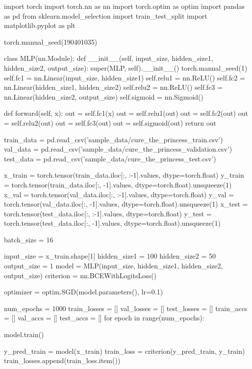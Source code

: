 \documentclass[11pt]{article}
\begin{document}
\begin{python}
import torch
import torch.nn as nn
import torch.optim as optim
import pandas as pd
from sklearn.model_selection import train_test_split
import matplotlib.pyplot as plt

torch.manual_seed(190401035)

class MLP(nn.Module):
    def __init__(self, input_size, hidden_size1, hidden_size2, output_size):
        super(MLP, self).__init__()
        torch.manual_seed(1)
        self.fc1 = nn.Linear(input_size, hidden_size1)
        self.relu1 = nn.ReLU()
        self.fc2 = nn.Linear(hidden_size1, hidden_size2)
        self.relu2 = nn.ReLU()
        self.fc3 = nn.Linear(hidden_size2, output_size)
        self.sigmoid = nn.Sigmoid()

    def forward(self, x):
        out = self.fc1(x)
        out = self.relu1(out)
        out = self.fc2(out)
        out = self.relu2(out)
        out = self.fc3(out)
        out = self.sigmoid(out)
        return out


train_data = pd.read_csv('sample_data/cure_the_princess_train.csv')
val_data = pd.read_csv('sample_data/cure_the_princess_validation.csv')
test_data = pd.read_csv('sample_data/cure_the_princess_test.csv')


x_train = torch.tensor(train_data.iloc[:, :-1].values, dtype=torch.float)
y_train = torch.tensor(train_data.iloc[:, -1].values, dtype=torch.float).unsqueeze(1)
x_val = torch.tensor(val_data.iloc[:, :-1].values, dtype=torch.float)
y_val = torch.tensor(val_data.iloc[:, -1].values, dtype=torch.float).unsqueeze(1)
x_test = torch.tensor(test_data.iloc[:, :-1].values, dtype=torch.float)
y_test = torch.tensor(test_data.iloc[:, -1].values, dtype=torch.float).unsqueeze(1)

batch_size = 16

input_size = x_train.shape[1]
hidden_size1 = 100
hidden_size2 = 50
output_size = 1
model = MLP(input_size, hidden_size1, hidden_size2, output_size)
criterion = nn.BCEWithLogitsLoss()

optimizer = optim.SGD(model.parameters(), lr=0.1)


num_epochs = 1000
train_losses = []
val_losses = []
test_losses = []
train_accs = []
val_accs = []
test_accs = []
for epoch in range(num_epochs):
    
    model.train()
    
    
    y_pred_train = model(x_train)
    train_loss = criterion(y_pred_train, y_train)
    train_losses.append(train_loss.item())


\end{python}
\end{document}
